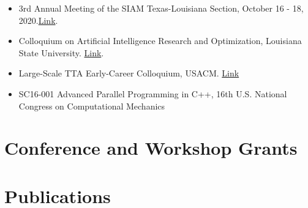 \documentclass[11pt,a4paper,sans]{moderncv}
\begin{document}
\begin{itemize}[leftmargin=4cm]
\item 3rd Annual Meeting of the SIAM Texas-Louisiana Section, October 16 - 18, 2020.\href{https://www.math.tamu.edu/conferences/SIAMTXLA/}{Link}.
\end{itemize}

\begin{itemize}[leftmargin=4cm]
\item Colloquium on Artificial Intelligence Research and Optimization, Louisiana State University. \href{https://stellar-group.org/research/distributed-machine-learning/}{Link}.
\item Large-Scale TTA Early-Career Colloquium, USACM. \href{https://unsacm.memberclicks.net/tta--large-scale-structural-systems }{Link}
\end{itemize}

\begin{itemize}[leftmargin=4cm]
\item SC16-001 Advanced Parallel Programming in C++, 16th U.S. National Congress on Computational Mechanics
\end{itemize}

\section{Conference and Workshop Grants}

\section{Publications}



 

\end{document}
